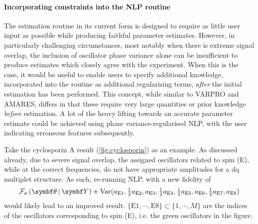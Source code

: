 \paragraph{Incorporating constraints into the \ac{NLP} routine}
The estimation routine in its current form is designed to require as little
user input as possible while producing faithful parameter estimates. However,
in particularly challenging circumstances, most notably when
there is extreme signal overlap, the inclusion of oscillator phase variance
alone can be insufficient to produce estimates which closely agree with the
experiment. When this is the case, it would be useful to enable users to
specify additional knowledge, incorporated into the routine as additional
regularising terms, \emph{after} the initial estimation has been performed.
This concept, while similar to \ac{VARPRO} and \ac{AMARES}, differs in that
these require very large quantities or prior knowledge \emph{before}
estimation. A lot of the heavy lifting towards an accurate parameter estimate
could be achieved using phase variance-regularised \ac{NLP}, with the user
indicating erroneous features subsequently.

Take the cyclosporin A result (\cref{fig:cyclosporin}) as an example. As
discussed already, due to severe signal overlap, the assigned oscillators
related to spin (E), while at the correct frequencies, do not have appropriate
amplitudes for a dq multiplet structure. As such, re-running \ac{NLP}, with a
new fidelity of
\[
    \FphithY + \Var(
        a_{\text{E}1},
        \tfrac{1}{3} a_{\text{E}2},
        a_{\text{E}3},
        \tfrac{1}{3} a_{\text{E}4},
        \tfrac{1}{3} a_{\text{E}5},
        a_{\text{E}6},
        \tfrac{1}{3} a_{\text{E}7},
        a_{\text{E}8}
    )
\]
would likely lead to an improved result.
$\lbrace \text{E}1, \cdots, \text{E}8 \rbrace \subset \lbrace 1, \cdots, M \rbrace$ are the
indices of the oscillators corresponding to spin (E), i.e. the green
oscillators in the figure.
